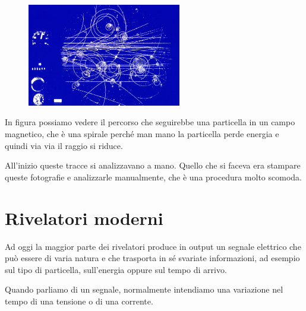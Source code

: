\begin{figure}[H]
   \centering
   \includegraphics[width=0.6\textwidth]{immagini/camera_a_bolle.png}
\end{figure}

In figura possiamo vedere il percorso che seguirebbe una particella in un campo magnetico, che è una spirale perché man mano la particella perde energia e quindi via via il raggio si riduce.

All'inizio queste tracce si analizzavano a mano. Quello che si faceva era stampare queste fotografie e analizzarle manualmente, che è una procedura molto scomoda.

\section{Rivelatori moderni}

Ad oggi la maggior parte dei rivelatori produce in output un segnale elettrico che può essere di varia natura e che trasporta in sé svariate informazioni, ad esempio sul tipo di particella, sull'energia oppure sul tempo di arrivo.


Quando parliamo di un segnale, normalmente intendiamo una variazione nel tempo di una tensione o di una corrente.

\begin{figure}[H]
   \centering
\end{figure}


